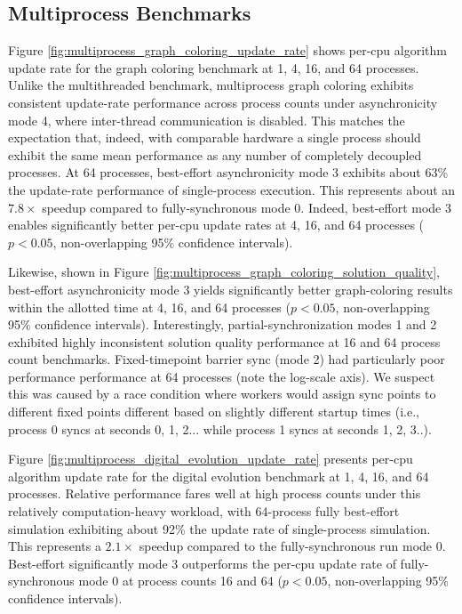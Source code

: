 \subsection{Multiprocess Benchmarks}



Figure \ref{fig:multiprocess_graph_coloring_update_rate} shows per-cpu algorithm update rate for the graph coloring benchmark at 1, 4, 16, and 64 processes.
Unlike the multithreaded benchmark, multiprocess graph coloring exhibits consistent update-rate performance across process counts under asynchronicity mode 4, where inter-thread communication is disabled.
This matches the expectation that, indeed, with comparable hardware a single process should exhibit the same mean performance as any number of completely decoupled processes.
At 64 processes, best-effort asynchronicity mode 3 exhibits about 63\% the update-rate performance of single-process execution. 
This represents about an $7.8\times$ speedup compared to fully-synchronous mode 0.
Indeed, best-effort mode 3 enables significantly better per-cpu update rates at 4, 16, and 64 processes ($p < 0.05$, non-overlapping 95\% confidence intervals).

Likewise, shown in Figure \ref{fig:multiprocess_graph_coloring_solution_quality}, best-effort asynchronicity mode 3 yields significantly better graph-coloring results within the allotted time at 4, 16, and 64 processes ($p < 0.05$, non-overlapping 95\% confidence intervals).
Interestingly, partial-synchronization modes 1 and 2 exhibited highly inconsistent solution quality performance at 16 and 64 process count benchmarks.
Fixed-timepoint barrier sync (mode 2) had particularly poor performance performance at 64 processes (note the log-scale axis).
We suspect this was caused by a race condition where workers would assign sync points to different fixed points different based on slightly different startup times (i.e., process 0 syncs at seconds 0, 1, 2... while process 1 syncs at seconds 1, 2, 3..).

Figure \ref{fig:multiprocess_digital_evolution_update_rate} presents per-cpu algorithm update rate for the digital evolution benchmark at 1, 4, 16, and 64 processes.
Relative performance fares well at high process counts under this relatively computation-heavy workload, with 64-process fully best-effort simulation exhibiting about 92\% the update rate of single-process simulation.
This represents a $2.1\times$ speedup compared to the fully-synchronous run mode 0.
Best-effort significantly mode 3 outperforms the per-cpu update rate of fully-synchronous mode 0 at process counts 16 and 64 ($p < 0.05$, non-overlapping 95\% confidence intervals).
